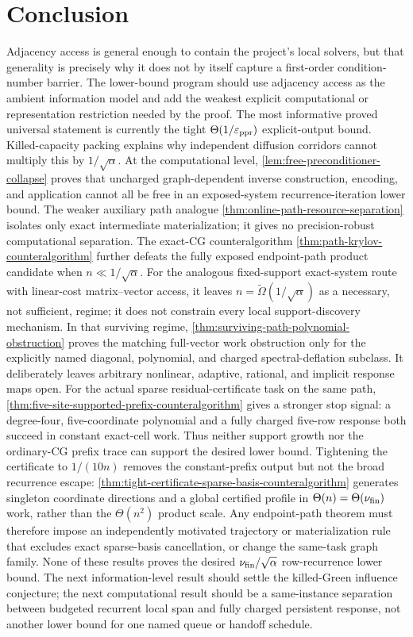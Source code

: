 \section{Conclusion}
\label{sec:conclusion}

Adjacency access is general enough to contain the project's local solvers, but
that generality is precisely why it does not by itself capture a first-order
condition-number barrier.  The lower-bound program should use adjacency access
as the ambient information model and add the weakest explicit computational
or representation restriction needed by the proof.  The most informative
proved universal statement is currently the tight
$\Theta(1/\varepsilon_{\mathrm{ppr}})$ explicit-output bound.  Killed-capacity packing explains
why independent diffusion corridors cannot multiply this by
$1/\sqrt\alpha$.  At the computational level,
\cref{lem:free-preconditioner-collapse} proves that uncharged graph-dependent
inverse construction, encoding, and application cannot all be free in an
exposed-system recurrence-iteration lower bound.  The weaker auxiliary path
analogue \cref{thm:online-path-resource-separation} isolates only exact
intermediate materialization; it gives no precision-robust computational
separation.  The exact-CG counteralgorithm
\cref{thm:path-krylov-counteralgorithm} further defeats the fully exposed
endpoint-path product candidate when $n\ll1/\sqrt\alpha$.  For the analogous
fixed-support exact-system route with linear-cost matrix--vector access, it
leaves $n=\widetilde\Omega(1/\sqrt\alpha)$ as a necessary, not sufficient,
regime; it does not constrain every local support-discovery mechanism.
In that surviving regime,
\cref{thm:surviving-path-polynomial-obstruction} proves the matching
full-vector work obstruction only for the explicitly named diagonal,
polynomial, and charged spectral-deflation subclass.  It deliberately leaves
arbitrary nonlinear, adaptive, rational, and implicit response maps open.
For the actual sparse residual-certificate task on the same path,
\cref{thm:five-site-supported-prefix-counteralgorithm} gives a stronger stop
signal: a degree-four, five-coordinate polynomial and a fully charged
five-row response both succeed in constant exact-cell work.  Thus neither
support growth nor the ordinary-CG prefix trace can support the desired lower
bound.  Tightening the certificate to $1/(10n)$ removes the constant-prefix
output but not the broad recurrence escape:
\cref{thm:tight-certificate-sparse-basis-counteralgorithm} generates
singleton coordinate directions and a global certified profile in
$\Theta(n)=\Theta(\nu_{\rm fin})$ work, rather than the
$\Theta(n^2)$ product scale.  Any endpoint-path theorem must therefore impose
an independently motivated trajectory or materialization rule that excludes
exact sparse-basis cancellation, or change the same-task graph family.
None of these results proves the desired
$\nu_{\rm fin}/\sqrt\alpha$ row-recurrence lower bound.
The next information-level result should settle the killed-Green influence
conjecture; the next computational result should be a same-instance separation
between budgeted recurrent local span and fully charged persistent response,
not another lower bound for one named queue or handoff schedule.

